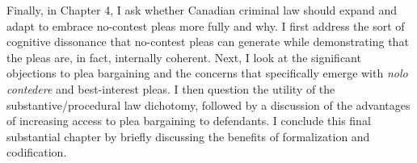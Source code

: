 Finally, in Chapter 4, I ask whether Canadian criminal law should expand and adapt to embrace no-contest pleas more fully and why. I first address the sort of cognitive dissonance that no-contest pleas can generate while demonstrating that the pleas are, in fact, internally coherent. Next, I look at the significant objections to plea bargaining and the concerns that specifically emerge with \textit{nolo contedere} and best-interest pleas. I then question the utility of the substantive/procedural law dichotomy, followed by a discussion of the advantages of increasing access to plea bargaining to defendants. I conclude this final substantial chapter by briefly discussing the benefits of formalization and codification.